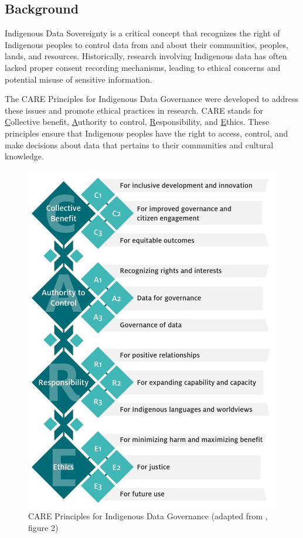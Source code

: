 \documentclass[a0,portrait]{a0poster}
\begin{document}
\setlength{\columnsep}{2cm}
\begin{multicols}{2}

\color{ARDCPink}
\section*{\LARGE Background}
\color{DarkGrey}
\large{
Indigenous Data Sovereignty is a critical concept that recognizes the right of Indigenous peoples to control data from and about their communities, peoples, lands, and resources. Historically, research involving Indigenous data has often lacked proper consent recording mechanisms, leading to ethical concerns and potential misuse of sensitive information.

The CARE Principles for Indigenous Data Governance were developed to address these issues and promote ethical practices in research. CARE stands for \underline{C}ollective benefit, \underline{A}uthority to control, \underline{R}esponsibility, and \underline{E}thics. These principles ensure that Indigenous peoples have the right to access, control, and make decisions about data that pertains to their communities and cultural knowledge.

\par
\begin{figure}
\vspace{-1cm}  %
\includegraphics[width=0.43\columnwidth]{figures/CARE-principles.png}
\caption{CARE Principles for Indigenous Data Governance (adapted from \citet{Carroll2020}, figure 2)}
\vspace{1cm}  %
\end{figure}

}
\end{multicols}
\end{document}

